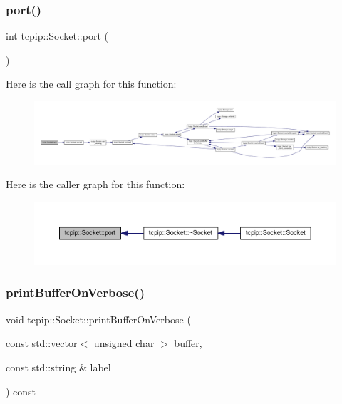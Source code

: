 \subsubsection{\texorpdfstring{port()}{port()}}
{\footnotesize\ttfamily int tcpip\+::\+Socket\+::port (\begin{DoxyParamCaption}{ }\end{DoxyParamCaption})}

Here is the call graph for this function\+:\nopagebreak
\begin{figure}[H]
\begin{center}
\leavevmode
\includegraphics[width=350pt]{classtcpip_1_1_socket_ab7e67c84c32557ffb98d940081497d67_cgraph}
\end{center}
\end{figure}
Here is the caller graph for this function\+:\nopagebreak
\begin{figure}[H]
\begin{center}
\leavevmode
\includegraphics[width=350pt]{classtcpip_1_1_socket_ab7e67c84c32557ffb98d940081497d67_icgraph}
\end{center}
\end{figure}
\mbox{\label{classtcpip_1_1_socket_a08e08cdc00fd69a51e2cdd8ecb22d1e0}} 
\subsubsection{\texorpdfstring{print\+Buffer\+On\+Verbose()}{printBufferOnVerbose()}}
{\footnotesize\ttfamily void tcpip\+::\+Socket\+::print\+Buffer\+On\+Verbose (\begin{DoxyParamCaption}\item[{const std\+::vector$<$ unsigned char $>$}]{buffer,  }\item[{const std\+::string \&}]{label }\end{DoxyParamCaption}) const\hspace{0.3cm}{\ttfamily [protected]}}



